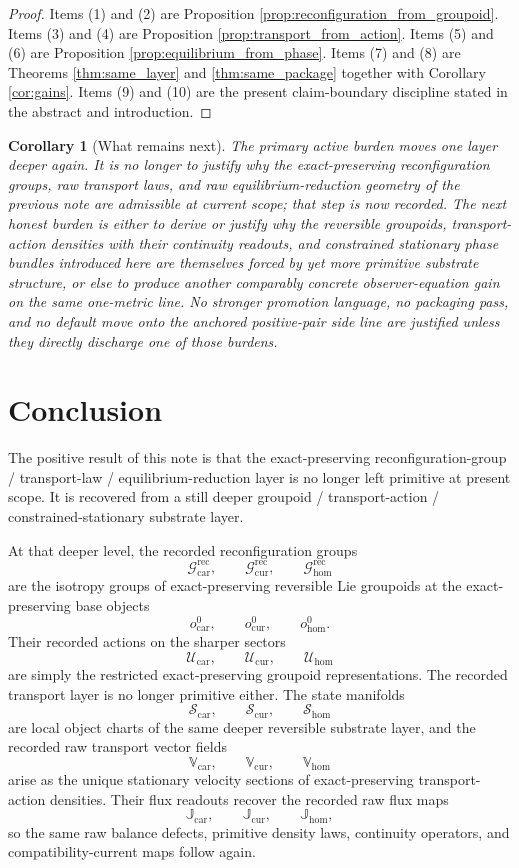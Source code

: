 \documentclass[11pt]{article}
\newcommand{\RootTensorClass}{\mathscr U_{\mathrm{car}}}
\newcommand{\RootRelabelClass}{\mathscr U_{\mathrm{cur}}}
\newcommand{\RootFreeClass}{\mathscr U_{\mathrm{hom}}}
\newcommand{\TensorReconGroup}{\mathcal G_{\mathrm{car}}^{\mathrm{rec}}}
\newcommand{\CurReconGroup}{\mathcal G_{\mathrm{cur}}^{\mathrm{rec}}}
\newcommand{\HomReconGroup}{\mathcal G_{\mathrm{hom}}^{\mathrm{rec}}}
\newcommand{\TensorStateManifold}{\mathcal S_{\mathrm{car}}}
\newcommand{\CurStateManifold}{\mathcal S_{\mathrm{cur}}}
\newcommand{\HomStateManifold}{\mathcal S_{\mathrm{hom}}}
\newcommand{\TensorTransport}{\mathbb V_{\mathrm{car}}}
\newcommand{\CurTransport}{\mathbb V_{\mathrm{cur}}}
\newcommand{\HomTransport}{\mathbb V_{\mathrm{hom}}}
\newcommand{\TensorFlux}{\mathbb J_{\mathrm{car}}}
\newcommand{\CurFlux}{\mathbb J_{\mathrm{cur}}}
\newcommand{\HomFlux}{\mathbb J_{\mathrm{hom}}}
\newcommand{\TensorObjBase}{o_{\mathrm{car}}^0}
\newcommand{\CurObjBase}{o_{\mathrm{cur}}^0}
\newcommand{\HomObjBase}{o_{\mathrm{hom}}^0}
\newtheorem{corollary}{Corollary}
\begin{document}
\begin{proof}
Items (1) and (2) are Proposition \ref{prop:reconfiguration_from_groupoid}. Items (3) and (4) are Proposition \ref{prop:transport_from_action}. Items (5) and (6) are Proposition \ref{prop:equilibrium_from_phase}. Items (7) and (8) are Theorems \ref{thm:same_layer} and \ref{thm:same_package} together with Corollary \ref{cor:gains}. Items (9) and (10) are the present claim-boundary discipline stated in the abstract and introduction.
\end{proof}

\begin{corollary}[What remains next]
\label{cor:what_next}
The primary active burden moves one layer deeper again. It is no longer to justify why the exact-preserving reconfiguration groups, raw transport laws, and raw equilibrium-reduction geometry of the previous note are admissible at current scope; that step is now recorded. The next honest burden is either to derive or justify why the reversible groupoids, transport-action densities with their continuity readouts, and constrained stationary phase bundles introduced here are themselves forced by yet more primitive substrate structure, or else to produce another comparably concrete observer-equation gain on the same one-metric line. No stronger promotion language, no packaging pass, and no default move onto the anchored positive-pair side line are justified unless they directly discharge one of those burdens.
\end{corollary}

\section{Conclusion}

The positive result of this note is that the exact-preserving reconfiguration-group / transport-law / equilibrium-reduction layer is no longer left primitive at present scope. It is recovered from a still deeper groupoid / transport-action / constrained-stationary substrate layer.

At that deeper level, the recorded reconfiguration groups
\[
\TensorReconGroup,\qquad
\CurReconGroup,\qquad
\HomReconGroup
\]
are the isotropy groups of exact-preserving reversible Lie groupoids at the exact-preserving base objects
\[
\TensorObjBase,\qquad
\CurObjBase,\qquad
\HomObjBase.
\]
Their recorded actions on the sharper sectors
\[
\RootTensorClass,\qquad
\RootRelabelClass,\qquad
\RootFreeClass
\]
are simply the restricted exact-preserving groupoid representations. The recorded transport layer is no longer primitive either. The state manifolds
\[
\TensorStateManifold,\qquad
\CurStateManifold,\qquad
\HomStateManifold
\]
are local object charts of the same deeper reversible substrate layer, and the recorded raw transport vector fields
\[
\TensorTransport,\qquad
\CurTransport,\qquad
\HomTransport
\]
arise as the unique stationary velocity sections of exact-preserving transport-action densities. Their flux readouts recover the recorded raw flux maps
\[
\TensorFlux,\qquad
\CurFlux,\qquad
\HomFlux,
\]
so the same raw balance defects, primitive density laws, continuity operators, and compatibility-current maps follow again.
\end{document}
